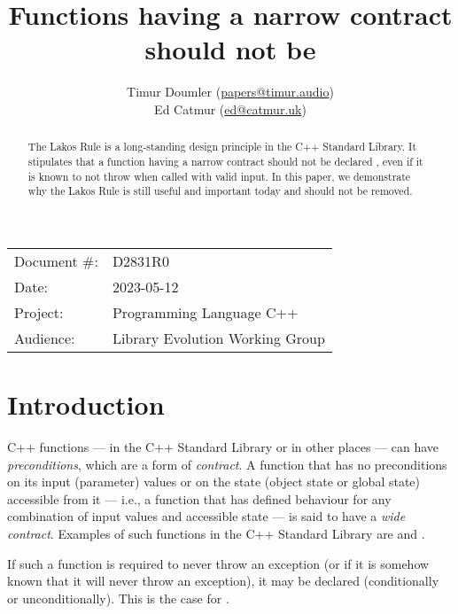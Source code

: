 


\title{Functions having a narrow contract should not be }
\author{ Timur Doumler \small(\href{mailto:papers@timur.audio}{papers@timur.audio})   \\
Ed Catmur \small(\href{mailto:ed@catmur.uk}{ed@catmur.uk})  }
\date{}
\maketitle

\begin{tabular}{ll}
Document \#: & D2831R0 \\
Date: &2023-05-12 \\
Project: & Programming Language C++ \\
Audience: & Library Evolution Working Group
\end{tabular}

\begin{abstract}
The Lakos Rule is a long-standing design principle in the C++ Standard Library. It stipulates that a function having a narrow contract should not be declared , even if it is known to not throw when called with valid input. In this paper, we demonstrate why the Lakos Rule is still useful and important today and should not be removed.
\end{abstract}


\section{Introduction}
\label{sec:intro}

C++ functions --- in the C++ Standard Library or in other places --- can have \emph{preconditions}, which are a form of \emph{contract}. A function that has no preconditions on its input (parameter) values or on the state (object state or global state) accessible from it --- i.e., a function that has defined behaviour for any combination of input values and accessible state --- is said to have a \emph{wide contract}. Examples of such functions in the C++ Standard Library are  and .

If such a function is required to never throw an exception (or if it is somehow known that it will never throw an exception), it may be declared  (conditionally or unconditionally). This is the case for .

